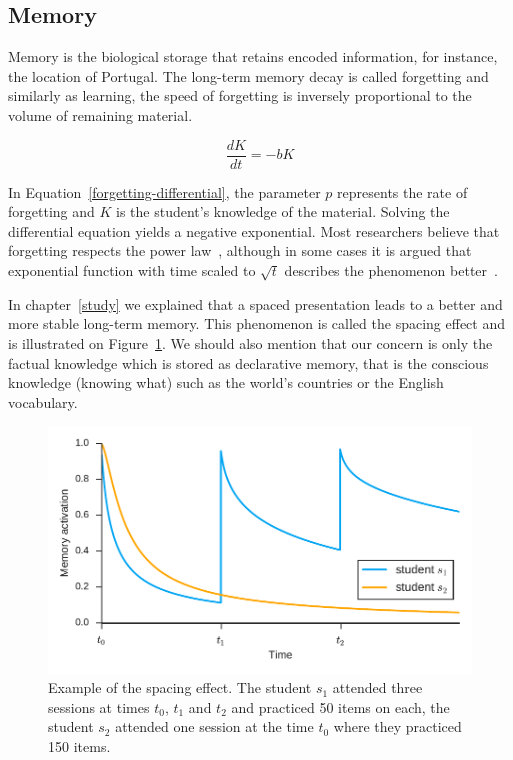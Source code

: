 \subsection{Memory}
\label{memory}

Memory is the biological storage that retains encoded information, for instance, the location of Portugal. The long-term memory decay is called forgetting and similarly as learning, the speed of forgetting is inversely proportional to the volume of remaining material.

\begin{equation} \label{forgetting-differential}
  \frac{dK}{dt} = -bK
\end{equation}

In Equation~\ref{forgetting-differential}, the parameter $p$ represents the rate of forgetting and $K$ is the student's knowledge of the material. Solving the differential equation yields a negative exponential. Most researchers believe that forgetting respects the power law~\cite{MichaelW.Eysenck2008}, although in some cases it is argued that exponential function with time scaled to $\sqrt{t}$ describes the phenomenon better~\cite{White2001}.

In chapter~\ref{study} we explained that a spaced presentation leads to a better and more stable long-term memory. This phenomenon is called the spacing effect and is illustrated on Figure~\ref{fig:spacing-effect}. We should also mention that our concern is only the factual knowledge which is stored as declarative memory, that is the conscious knowledge (knowing what) such as the world's countries or the English vocabulary.

\begin{figure}[htbp]
  \centering
  \includegraphics[width=\textwidth]{img/spacing-effect}
  \caption{Example of the spacing effect. The student $s_1$ attended three sessions at times $t_0$, $t_1$ and $t_2$ and practiced 50 items on each, the student $s_2$ attended one session at the time $t_0$ where they practiced 150 items.}
  \label{fig:spacing-effect}
\end{figure}

